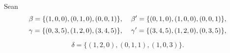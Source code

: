 Sean 
\begin{equation}
	\label{eq: ej4, beta}
	\beta = \{ (1, 0, 0), (0, 1, 0), (0, 0, 1) \}, 
	\hspace{0.4cm}
	\beta ' = \{ (0, 1, 0), (1, 0, 0), (0, 0, 1) \},
\end{equation}
\begin{equation}
	\label{eq: ej4, gamma}
	\gamma = \{ (0, 3, 5), (1, 2, 0), (3, 4, 5) \}, 
	\hspace{0.4cm}
	\gamma ' = \{ (3, 4, 5), (1, 2, 0), (0, 3, 5) \},
\end{equation}

\begin{equation}
\label{eq: ej4, delta}
	\delta = \{ (1, 2, 0), (0, 1, 1), (1, 0, 3) \}.
\end{equation}

